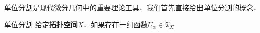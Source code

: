 

单位分割是现代微分几何中的重要理论工具．我们首先直接给出单位分割的概念．

\begin{definition}{单位分割}
给定\textbf{拓扑空间}$X$．如果存在一组函数$U_\alpha\in\mathfrak{T}_X$
\end{definition}







